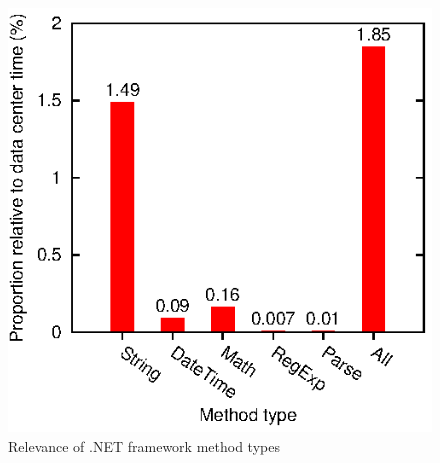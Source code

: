 \begin{figure}[ht]
\includegraphics{graphs/methodTypes}
\caption{Relevance of .NET framework method types}
\label{fig:methodTypes}
\end{figure}








